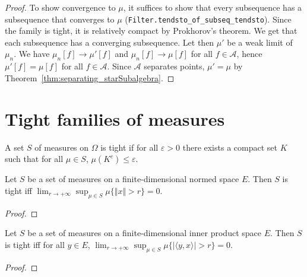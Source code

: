 \begin{proof}
\leanok
To show convergence to $\mu$, it suffices to show that every subsequence has a subsequence that converges to $\mu$ (\texttt{Filter.tendsto\_of\_subseq\_tendsto}).
Since the family is tight, it is relatively compact by Prokhorov's theorem. We get that each subsequence has a converging subsequence.
Let then $\mu'$ be a weak limit of $\mu_n$. We have $\mu_n[f] \to \mu'[f]$ and $\mu_n[f] \to \mu[f]$ for all $f \in \mathcal A$, hence $\mu'[f] = \mu[f]$ for all $f \in \mathcal A$. Since $\mathcal A$ separates points, $\mathcal \mu' = \mu$ by Theorem~\ref{thm:separating_starSubalgebra}.
\end{proof}


\chapter{Tight families of measures}

\begin{definition}\label{def:tight}
 \mathlibok
A set $S$ of measures on $\Omega$ is tight if for all $\varepsilon > 0$ there exists a compact set $K$ such that for all $\mu \in S$, $\mu(K^c) \le \varepsilon$.
\end{definition}


\begin{lemma}\label{lem:isTightMeasureSet_iff_norm}
\mathlibok
{}
Let $S$ be a set of measures on a finite-dimensional normed space $E$. 
Then $S$ is tight iff $\lim_{r \to +\infty}\sup_{\mu \in S} \mu\{\Vert x \Vert > r\} = 0$.
\end{lemma}

\begin{proof}\leanok

\end{proof}
	

\begin{lemma}\label{lem:isTightMeasureSet_iff_sup_inner}
\mathlibok
{}
Let $S$ be a set of measures on a finite-dimensional inner product space $E$.
Then $S$ is tight iff for all $y \in E$, $\lim_{r \to +\infty}\sup_{\mu \in S} \mu\{\vert\langle y, x\rangle\vert > r\} = 0$.
\end{lemma}

\begin{proof}\leanok
{}
\end{proof}


